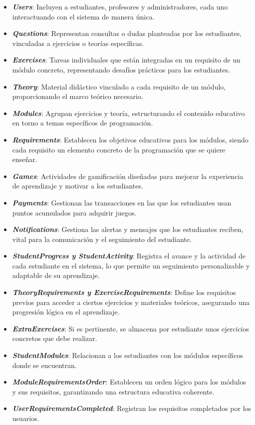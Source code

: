 \begin{itemize}
    \item \textit{\textbf{Users}}: Incluyen a estudiantes, profesores y administradores, cada uno interactuando con el sistema de manera única.
    \item \textit{\textbf{Questions}}: Representan consultas o dudas planteadas por los estudiantes, vinculadas a ejercicios o teorías específicas.
    \item \textit{\textbf{Exercises}}: Tareas individuales que están integradas en un requisito de un módulo concreto, representando desafíos prácticos para los estudiantes.
    \item \textit{\textbf{Theory}}: Material didáctico vinculado a cada requisito de un módulo, proporcionando el marco teórico necesario.
    \item \textit{\textbf{Modules}}: Agrupan ejercicios y teoría, estructurando el contenido educativo en torno a temas específicos de programación.
    \item \textit{\textbf{Requirements}}: Establecen los objetivos educativos para los módulos, siendo cada requisito un elemento concreto de la programación que se quiere enseñar.
    \item \textit{\textbf{Games}}: Actividades de gamificación diseñadas para mejorar la experiencia de aprendizaje y motivar a los estudiantes.
    \item \textit{\textbf{Payments}}: Gestionan las transacciones en las que los estudiantes usan puntos acumulados para adquirir juegos.
    \item \textit{\textbf{Notifications}}: Gestiona las alertas y mensajes que los estudiantes reciben, vital para la comunicación y el seguimiento del estudiante.
    \item \textit{\textbf{StudentProgress y StudentActivity}}: Registra el avance y la actividad de cada estudiante en el sistema, lo que permite un seguimiento personalizable y adaptable de su aprendizaje.
    \item \textit{\textbf{TheoryRequirements y ExerciseRequirements}}: Define los requisitos previos para acceder a ciertos ejercicios y materiales teóricos, asegurando una progresión lógica en el aprendizaje.
    \item \textit{\textbf{ExtraExercises}}: Si es pertinente, se almacena por estudiante unos ejercicios concretos que debe realizar.
    \item \textit{\textbf{StudentModules}}: Relacionan a los estudiantes con los módulos específicos donde se encuentran. 
    \item \textit{\textbf{ModuleRequirementsOrder}}: Establecen un orden lógico para los módulos y sus requisitos, garantizando una estructura educativa coherente.
    \item \textit{\textbf{UserRequirementsCompleted}}: Registran los requisitos completados por los usuarios.
\end{itemize}

